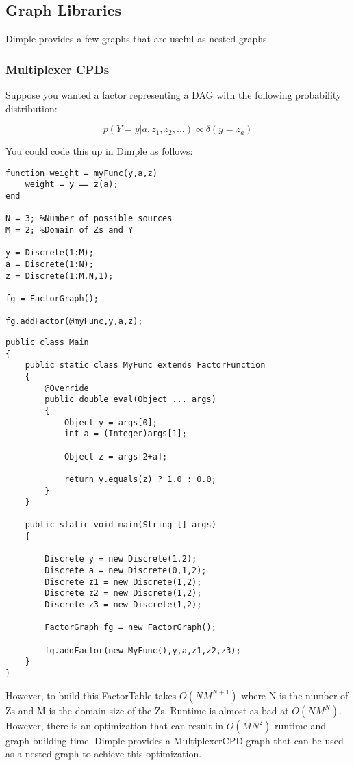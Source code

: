 \subsection{Graph Libraries}

Dimple provides a few graphs that are useful as nested graphs.

\subsubsection{Multiplexer CPDs}
\label{sec:multiplexerCPD}

Suppose you wanted a factor representing a DAG with the following probability distribution:

\[
p(Y=y|a,z_1,z_2,...) \propto \delta(y = z_a)
\]

You could code this up in Dimple as follows:

\ifmatlab
\begin{lstlisting}
function weight = myFunc(y,a,z)
    weight = y == z(a);
end

N = 3; %Number of possible sources
M = 2; %Domain of Zs and Y

y = Discrete(1:M);
a = Discrete(1:N);
z = Discrete(1:M,N,1);
 
fg = FactorGraph();
 
fg.addFactor(@myFunc,y,a,z);
\end{lstlisting}
\fi

\ifjava
\begin{lstlisting}
public class Main 
{		
	public static class MyFunc extends FactorFunction
	{
		@Override
		public double eval(Object ... args)
		{
			Object y = args[0];
			int a = (Integer)args[1];
			
			Object z = args[2+a];
			
			return y.equals(z) ? 1.0 : 0.0;
		}
	}
	
	public static void main(String [] args)
	{
		
		Discrete y = new Discrete(1,2);
		Discrete a = new Discrete(0,1,2);
		Discrete z1 = new Discrete(1,2);
		Discrete z2 = new Discrete(1,2);
		Discrete z3 = new Discrete(1,2);
		 
		FactorGraph fg = new FactorGraph();
		 
		fg.addFactor(new MyFunc(),y,a,z1,z2,z3);
	}
}
\end{lstlisting}
\fi

However, to build this FactorTable takes $O(NM^{N+1})$ where N is the number of Zs and M is the domain size of the Zs.  Runtime is almost as bad at $O(NM^N)$.  However, there is an optimization that can result in $O(MN^2)$ runtime and graph building time.  Dimple provides a MultiplexerCPD graph that can be used as a nested graph to achieve this optimization.

